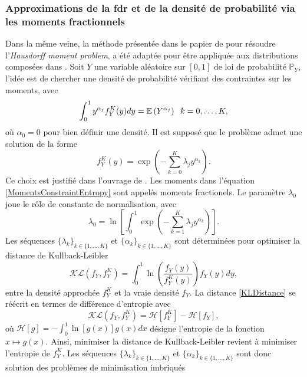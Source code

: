 \subsubsection{Approximations de la \gls{fdr} et de la densité de probabilité via les moments fractionnels}
Dans la même veine, la méthode présentée dans le papier de \citet{GzTa10} pour résoudre l\rq{}\textit{Hausdorff moment problem}, a été adaptée pour être appliquée aux distributions composées dans \citet{GzTa12}. Soit $Y$ une variable aléatoire sur $[0,1]$ de loi de probabilité $\mathbb{P}_{Y}$, l'idée est de chercher une densité de probabilité vérifiant des contraintes sur les moments, avec
\begin{equation}\label{MomentsConstraintEntropy}
\int_{0}^{1}y^{\alpha_{j}}f^{K}_{Y}(y)dy=\mathbb{E}\left(Y^{\alpha_{j}}\right)\hspace{0.2cm}k=0,\ldots,K,
\end{equation}
où $\alpha_{0}=0$ pour bien définir une densité. Il est supposé que le problème admet une solution de la forme
\begin{equation}\label{MaxEntropicDensity}
f^{K}_{Y}(y)=\exp\left(-\sum_{k=0}^{K}\lambda_{j}y^{\alpha_{k}}\right).
\end{equation} 
Ce choix est justifié dans l\rq{}ouvrage de \citet{KaKe92}. Les moments dans l'équation \eqref{MomentsConstraintEntropy} sont appelés moments fractionels. Le paramètre $\lambda_{0}$ joue le rôle de constante de normalisation, avec
\begin{equation}\label{NormalisationConstants}
\lambda_{0}=\ln\left[\int_{0}^{1}\exp\left(-\sum_{k=1}^{K}\lambda_{j}y^{\alpha_{k}}\right)\right].
\end{equation}
Les séquences $\{\lambda_{k}\}_{k\in\{1,\ldots,K\}}$ et $\{\alpha_{k}\}_{k\in\{1,\ldots,K\}}$ sont déterminées pour optimiser la distance de Kullback-Leibler
\begin{equation}\label{KLDistance}
\mathcal{KL}\left(f_{Y},f_{Y}^{K}\right)=\int_{0}^{1}\ln\left(\frac{f_{Y}(y)}{f_{Y}^{K}(y)}\right)f_{Y}(y)dy, 
\end{equation}
entre la densité approchée $f_{Y}^{K}$ et la vraie densité $f_{Y}$. La distance \eqref{KLDistance} se réécrit en termes de différence d\rq{}entropie avec
\begin{equation}\label{EntropieDifference}
\mathcal{KL}\left(f_{Y},f_{Y}^{K}\right)=\mathcal{H}\left[f_{Y}^{K}\right]-\mathcal{H}\left[f_{Y}\right],
\end{equation}
où $\mathcal{H}\left[g\right]=-\int_{0}^{1}\ln\left[g(x)\right]g(x)dx$ désigne l\rq{}entropie de la fonction $x\mapsto g(x)$. Ainsi, minimiser la distance de Kullback-Leibler revient à minimiser l\rq{}entropie de $f_{Y}^{K}$. Les séquences $\{\lambda_{k}\}_{k\in\{1,\ldots,K\}}$ et $\{\alpha_{k}\}_{k\in\{1,\ldots,K\}}$ sont donc solution des problèmes de minimisation imbriqués
